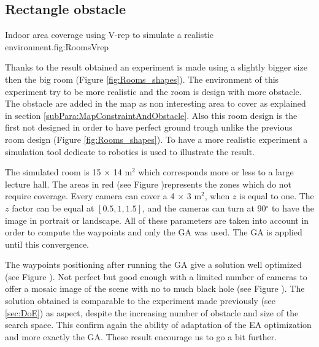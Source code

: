 	\subsection{Rectangle obstacle } \label{sec:expRectObstacle}
	\begin{mfigures}[!]{Indoor area coverage using V-rep to simulate a realistic environment.}{fig:RoomsVrep} \centering
{}
\hspace{1cm}
\hspace{1cm}

\tabsimuposeVrep
\end{mfigures}
	Thanks to the result obtained an experiment is made using a slightly bigger size then the big room (Figure \ref{fig:Rooms_shapes}). The environment of this experiment try to be more realistic and the room is design with more obstacle. 
	The obstacle are added in the map as non interesting area to cover as explained in  section \ref{subPara:MapConstraintAndObstacle}. Also this room design is the first not designed in order to have perfect ground trough unlike the previous room design (Figure \ref{fig:Rooms_shapes}).
	To have a more realistic experiment a simulation tool dedicate to robotics is used to illustrate the result. 
	     
	The simulated room is 15 $\times$ 14 m$^2$ which corresponds more or less to a large lecture hall. The areas in red (see Figure )represents the zones which do not require coverage. Every camera can cover a 4 $\times$ 3 m$^2$,  when $z$ is equal to one. The $z$ factor can be equal at $[0.5, 1, 1.5]$, and the cameras can turn  at 90$^{\circ}$ to have the image in portrait or landscape. All of these parameters are taken into account in order to compute the waypoints and only the GA was used. The GA is applied until this convergence. 
	
	The waypoints positioning after running the GA give a solution well optimized (see Figure ). Not perfect but good enough with a limited number of cameras to offer a  mosaic image of the scene with no to much black hole (see Figure ). The solution obtained is comparable to the experiment made previously (see \ref{sec:DoE}) as aspect, despite the increasing number of obstacle and size of the search space. This confirm again the ability of adaptation of the EA optimization and more exactly the GA. These result encourage us to go a bit further. 

